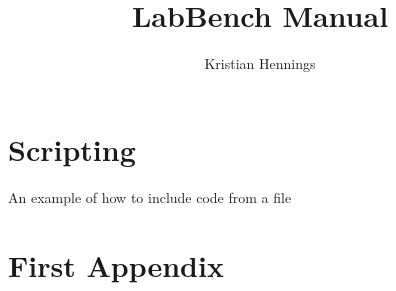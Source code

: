\documentclass[12pt, twoside, a4paper]{book}
\begin{document}
\title{LabBench Manual}
\author{Kristian Hennings}

\frontmatter
\maketitle

\tableofcontents



\mainmatter



\chapter{Scripting}

An example of how to include code from a file




\appendix

\chapter{First Appendix}

\backmatter
\end{document}
